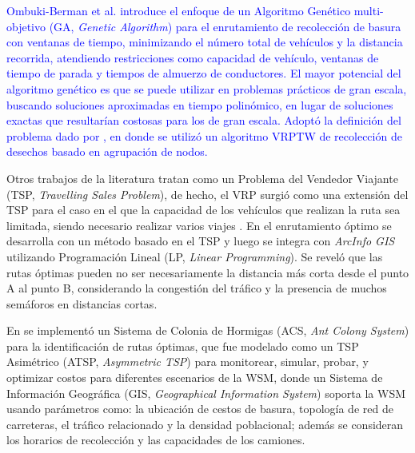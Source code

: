 \documentclass[spanish, conference]{IEEEtran}
\begin{document}
{\textcolor{blue}{Ombuki-Berman et al. \cite{Ombuki-Berman2007WASTEALGORITHMS} introduce el enfoque de un Algoritmo Genético multi-objetivo (GA, \textit{Genetic Algorithm}) para el enrutamiento de recolección de basura con ventanas de tiempo, minimizando el número total de vehículos y la distancia recorrida, atendiendo restricciones como capacidad de vehículo, ventanas de tiempo de parada y tiempos de almuerzo de conductores. El mayor potencial del algoritmo genético es que se puede utilizar en problemas prácticos de gran escala, buscando soluciones aproximadas en tiempo polinómico, en lugar de soluciones exactas que resultarían costosas para los de gran escala. Adoptó la definición del problema dado por \cite{Kim2006WasteWindows}, en donde se utilizó un algoritmo VRPTW de recolección de desechos basado en agrupación de nodos.}

Otros trabajos de la literatura tratan como un Problema del Vendedor Viajante (TSP, \textit{Travelling Sales Problem}), de hecho, el VRP surgió como una extensión del TSP para el caso en el que la capacidad de los vehículos que realizan la ruta sea limitada, siendo necesario realizar varios viajes \cite{CalvinoM2011CooperacionPanoramica}. En \cite{Billa2014GISOptimization} el enrutamiento óptimo se desarrolla con un método basado en el TSP y luego se integra con \textit{ArcInfo GIS} utilizando Programación Lineal (LP, \textit{Linear Programming}). Se reveló que las rutas óptimas pueden no ser necesariamente la distancia más corta desde el punto A al punto B, considerando la congestión del tráfico y la presencia de muchos semáforos en distancias cortas.

En \cite{Karadimas2007OptimalAlgorithm} se implementó un Sistema de Colonia de Hormigas (ACS, \textit{Ant Colony System}) para la identificación de rutas óptimas, que fue modelado como un TSP Asimétrico (ATSP, \textit{Asymmetric TSP}) para monitorear, simular, probar, y optimizar costos para diferentes escenarios de la WSM, donde un Sistema de Información Geográfica (GIS, \textit{Geographical Information System}) soporta la WSM usando parámetros como: la ubicación de cestos de basura, topología de red de carreteras, el tráfico relacionado y la densidad poblacional; además se consideran los horarios de recolección y las capacidades de los camiones.

}
\end{document}
